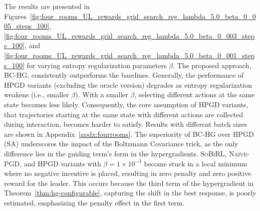 \documentclass[letterpaper]{article} %
\begin{document}
The results are presented in Figures~\ref{fig:four_rooms_UL_rewards_grid_search_reg_lambda_5.0_beta_0_005_steps_100}, \ref{fig:four_rooms_UL_rewards_grid_search_reg_lambda_5.0_beta_0_003_steps_100}, and \ref{fig:four_rooms_UL_rewards_grid_search_reg_lambda_5.0_beta_0_001_steps_100} for varying entropy regularization parameters $\beta$.
The proposed approach, \textsc{BC-HG}, consistently outperforms the baselines. 
Generally, the performance of \textsc{HPGD} variants (excluding the oracle version) degrades as entropy regularization weakens (i.e., smaller $\beta$). 
With a smaller $\beta$, selecting different actions at the same state becomes less likely. 
Consequently, the core assumption of \textsc{HPGD} variants, that trajectories starting at the same state with different actions are collected during interaction, becomes harder to satisfy. 
Results with different batch sizes are shown in Appendix~\ref{apdx:fourrooms}.
The superiority of \textsc{BC-HG} over \textsc{HPGD (SA)} underscores the impact of the Boltzmann Covariance trick, as the only difference lies in the guiding term's form in the hypergradients.
\textsc{SoBiRL}, \textsc{Naive-PGD}, and \textsc{HPGD} variants with $\beta = 1 \times 10^{-3}$ become stuck in a local minimum where no negative incentive is placed, resulting in zero penalty and zero positive reward for the leader.
This occurs because the third term of the hypergradient in Theorem~\ref{thm:hg-configurable}, capturing the shift in the best response, is poorly estimated, emphasizing the penalty effect in the first term.
\end{document}
